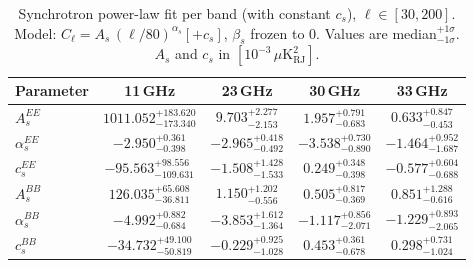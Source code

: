 \begin{table}[htbp]
\centering
\caption{Synchrotron power-law fit per band (with constant $c_s$), $\ell \in [30, 200]$. Model: $C_\ell = A_s\,(\ell/80)^{{\alpha_s}} [+ c_s]$, $\beta_s$ frozen to 0. Values are median$^{{+1\sigma}}_{{-1\sigma}}$. $A_s$ and $c_s$ in $[10^{-3}\,\mu\mathrm{K}^2_\mathrm{RJ}]$.}
\label{tab:sync_single_band_withc_ell30-200}
\begin{tabular}{lcccc}
\toprule
Parameter & 11\,GHz & 23\,GHz & 30\,GHz & 33\,GHz \\
\midrule
$A_s^{EE}$ & $1011.052^{+183.620}_{-173.340}$ & $9.703^{+2.277}_{-2.153}$ & $1.957^{+0.791}_{-0.683}$ & $0.633^{+0.847}_{-0.453}$ \\
$\alpha_s^{EE}$ & $-2.950^{+0.361}_{-0.398}$ & $-2.965^{+0.418}_{-0.492}$ & $-3.538^{+0.730}_{-0.890}$ & $-1.464^{+0.952}_{-1.687}$ \\
$c_s^{EE}$ & $-95.563^{+98.556}_{-109.631}$ & $-1.508^{+1.428}_{-1.533}$ & $0.249^{+0.348}_{-0.398}$ & $-0.577^{+0.604}_{-0.688}$ \\
\midrule
$A_s^{BB}$ & $126.035^{+65.608}_{-36.811}$ & $1.150^{+1.202}_{-0.556}$ & $0.505^{+0.817}_{-0.369}$ & $0.851^{+1.288}_{-0.616}$ \\
$\alpha_s^{BB}$ & $-4.992^{+0.882}_{-0.684}$ & $-3.853^{+1.612}_{-1.364}$ & $-1.117^{+0.856}_{-2.071}$ & $-1.229^{+0.893}_{-2.065}$ \\
$c_s^{BB}$ & $-34.732^{+49.100}_{-50.819}$ & $-0.229^{+0.925}_{-1.028}$ & $0.453^{+0.361}_{-0.678}$ & $0.298^{+0.731}_{-1.024}$ \\
\bottomrule
\end{tabular}
\end{table}